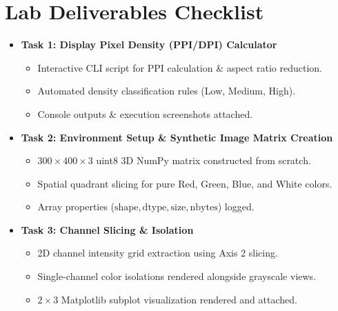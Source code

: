 \documentclass[12pt,a4paper]{article}
\begin{document}
\section*{Lab Deliverables Checklist}
\begin{mdframed}[backgroundcolor=gray!5, linecolor=tasktitleblue, linewidth=1pt, roundcorner=4pt]
    \begin{itemize}[label=$\checkmark$, leftmargin=2em]
        \item \textbf{Task 1: Display Pixel Density (PPI/DPI) Calculator}
        \begin{itemize}[label=$\bullet$, leftmargin=1.5em]
            \item Interactive CLI script for PPI calculation \& aspect ratio reduction.
            \item Automated density classification rules (Low, Medium, High).
            \item Console outputs \& execution screenshots attached.
        \end{itemize}
        
        \vspace{0.3em}
        \item \textbf{Task 2: Environment Setup \& Synthetic Image Matrix Creation}
        \begin{itemize}[label=$\bullet$, leftmargin=1.5em]
            \item $300 \times 400 \times 3$ uint8 3D NumPy matrix constructed from scratch.
            \item Spatial quadrant slicing for pure Red, Green, Blue, and White colors.
            \item Array properties ($\text{shape}, \text{dtype}, \text{size}, \text{nbytes}$) logged.
        \end{itemize}
        
        \vspace{0.3em}
        \item \textbf{Task 3: Channel Slicing \& Isolation}
        \begin{itemize}[label=$\bullet$, leftmargin=1.5em]
            \item 2D channel intensity grid extraction using Axis 2 slicing.
            \item Single-channel color isolations rendered alongside grayscale views.
            \item $2 \times 3$ Matplotlib subplot visualization rendered and attached.
        \end{itemize}
        

\end{itemize}
\end{mdframed}
\end{document}
